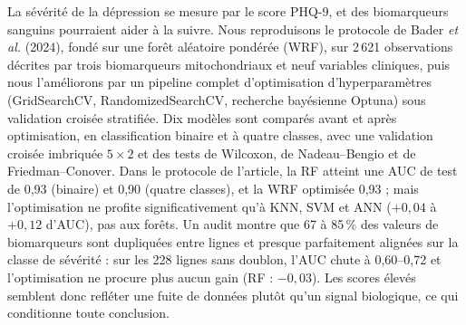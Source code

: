 La sévérité de la dépression se mesure par le score PHQ-9, et des biomarqueurs sanguins pourraient aider à la suivre. Nous reproduisons le protocole de Bader \emph{et al.} (2024), fondé sur une forêt aléatoire pondérée (WRF), sur 2\,621 observations décrites par trois biomarqueurs mitochondriaux et neuf variables cliniques, puis nous l'améliorons par un pipeline complet d'optimisation d'hyperparamètres (GridSearchCV, RandomizedSearchCV, recherche bayésienne Optuna) sous validation croisée stratifiée. Dix modèles sont comparés avant et après optimisation, en classification binaire et à quatre classes, avec une validation croisée imbriquée $5\times 2$ et des tests de Wilcoxon, de Nadeau--Bengio et de Friedman--Conover. Dans le protocole de l'article, la RF atteint une AUC de test de 0,93 (binaire) et 0,90 (quatre classes), et la WRF optimisée 0,93 ; mais l'optimisation ne profite significativement qu'à KNN, SVM et ANN ($+0{,}04$ à $+0{,}12$ d'AUC), pas aux forêts. Un audit montre que 67 à 85\,\% des valeurs de biomarqueurs sont dupliquées entre lignes et presque parfaitement alignées sur la classe de sévérité : sur les 228 lignes sans doublon, l'AUC chute à 0,60--0,72 et l'optimisation ne procure plus aucun gain (RF : $-0{,}03$). Les scores élevés semblent donc refléter une fuite de données plutôt qu'un signal biologique, ce qui conditionne toute conclusion.
